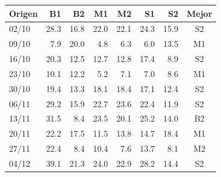 \begin{tabular}{lrrrrrrc}
\toprule
Origen & B1 & B2 & M1 & M2 & S1 & S2 & Mejor \\
\midrule
02/10 & 28.3 & 16.8 & 22.0 & 22.1 & 24.3 & 15.9 & S2 \\
09/10 & 7.9 & 20.0 & 4.8 & 6.3 & 6.0 & 13.5 & M1 \\
16/10 & 20.3 & 12.5 & 12.7 & 12.8 & 17.4 & 8.9 & S2 \\
23/10 & 10.1 & 12.2 & 5.2 & 7.1 & 7.0 & 8.6 & M1 \\
30/10 & 19.4 & 13.3 & 18.1 & 18.4 & 17.1 & 12.4 & S2 \\
06/11 & 29.2 & 15.9 & 22.7 & 23.6 & 22.4 & 11.9 & S2 \\
13/11 & 31.5 & 8.4 & 23.5 & 20.1 & 25.2 & 14.0 & B2 \\
20/11 & 22.2 & 17.5 & 11.5 & 13.8 & 14.7 & 18.4 & M1 \\
27/11 & 22.4 & 8.4 & 10.4 & 7.6 & 13.7 & 8.1 & M2 \\
04/12 & 39.1 & 21.3 & 24.0 & 22.9 & 28.2 & 14.4 & S2 \\
\bottomrule
\end{tabular}
